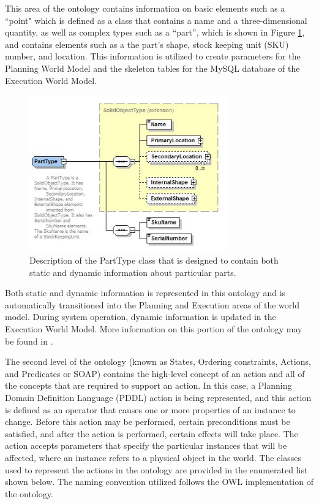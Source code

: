 This area of the ontology contains information on basic elements such as a ``point" which is defined as a class that contains a name 
and a three-dimensional quantity, as well as complex types such as a ``part'', which is
shown in Figure \ref{fig:part}, and
contains elements such as a the part's shape, stock keeping unit (SKU) number, and location. This information is utilized to create parameters for the Planning World
Model and the skeleton tables for the MySQL database of the Execution World Model.
%
\begin{figure}[htb!]
\begin{center}
\includegraphics[width=8.5cm]{images/Part.jpg}
\caption{Description of the PartType class that is designed to contain both static and dynamic information about particular parts.}
\label{fig:part}
\end{center}
\end{figure}
%
Both static and dynamic information is represented in this
ontology and is automatically transitioned into the Planning and Execution areas of the world model. During system
operation,  dynamic information is updated in the Execution World Model.
More information on this portion of the ontology may be found in \cite{Balakirsky2012-1}.


The second level of the ontology (known as States, Ordering constraints, Actions, and Predicates or SOAP) contains the high-level concept of an action and all of the concepts 
that are required to support an action. In this case, a Planning Domain Definition Language (PDDL) \cite{PDDL} action is being represented, and this action is defined
 as an operator that causes one or more properties of an 
instance to change. Before this action may be
performed, certain preconditions must be satisfied, and after the action is performed, certain effects will take place. The action accepts parameters that specify the particular
instances that will be affected, where an instance refers to a physical object in the world. The classes used to represent the actions in the ontology are provided in the
enumerated list shown below. The naming convention utilized follows the OWL \cite{OWLoverview} implementation of the ontology.

